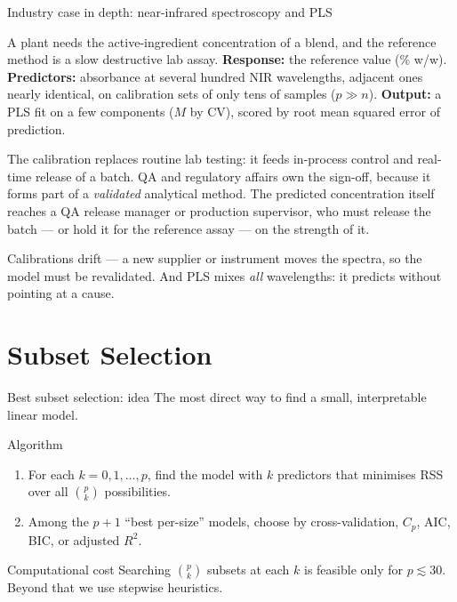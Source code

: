 \documentclass[aspectratio=169,11pt]{beamer}
\begin{document}
\begin{frame}{Industry case in depth: near-infrared spectroscopy and PLS}
  \footnotesize
  \begin{industry}
    A plant needs the active-ingredient concentration of a blend, and the
    reference method is a slow destructive lab assay.
    \textbf{Response:} the reference value (\% w/w).
    \textbf{Predictors:} absorbance at several hundred NIR wavelengths,
    adjacent ones nearly identical, on calibration sets of only tens of
    samples ($p \gg n$). \textbf{Output:} a PLS fit on a few components
    ($M$ by CV), scored by root mean squared error of prediction.
  \end{industry}
  \begin{readme}
    The calibration replaces routine lab testing: it feeds in-process
    control and real-time release of a batch. QA and regulatory affairs
    own the sign-off, because it forms part of a \emph{validated}
    analytical method. The predicted concentration itself reaches a QA
    release manager or production supervisor, who must release the batch
    --- or hold it for the reference assay --- on the strength of it.
  \end{readme}
  \begin{takeaway}
    Calibrations drift --- a new supplier or instrument moves the spectra,
    so the model must be revalidated. And PLS mixes \emph{all}
    wavelengths: it predicts without pointing at a cause.
  \end{takeaway}
\end{frame}


\section{Subset Selection}

\begin{frame}{Best subset selection: idea}
  The most direct way to find a small, interpretable linear model.
  \begin{block}{Algorithm}
    \begin{enumerate}
      \item For each $k = 0, 1, \ldots, p$, find the model with $k$
            predictors that minimises RSS over all $\binom{p}{k}$
            possibilities.
      \item Among the $p + 1$ ``best per-size'' models, choose by
            cross-validation, $C_p$, AIC, BIC, or adjusted $R^2$.
    \end{enumerate}
  \end{block}
  \begin{alertblock}{Computational cost}
    Searching $\binom{p}{k}$ subsets at each $k$ is feasible only for
    $p \lesssim 30$. Beyond that we use stepwise heuristics.
  \end{alertblock}
\end{frame}
\end{document}
